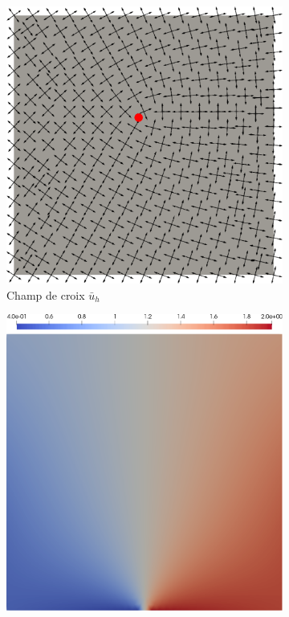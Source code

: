 \begin{figure}[h!]
\centering
\begin{subfigure}{0.5\textwidth}
    \includegraphics[width=\textwidth]{images/alignment_1.pdf}
    \caption{Champ de croix $\bar{u}_h$}
    \label{fig:alignment_1}
\end{subfigure}
\hfill
\begin{subfigure}{0.45\textwidth}
    \includegraphics[width=\textwidth]{images/alignment_2.pdf}

\end{subfigure}
\end{figure}
